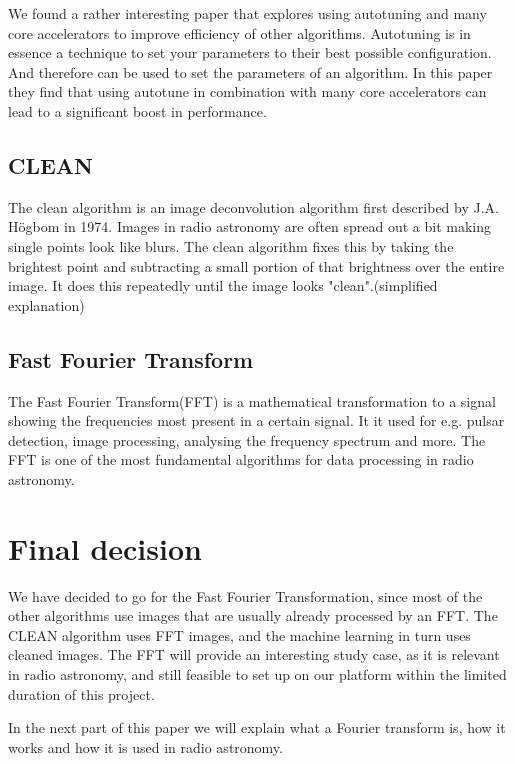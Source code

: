 \documentclass[11pt, A4, oneside]{article}
\begin{document}
We found a rather interesting paper that explores using autotuning and many core accelerators to improve efficiency of other algorithms\cite{Autotune}. Autotuning is in essence a technique to set your parameters to their best possible configuration. And therefore can be used to set the parameters of an algorithm. In this paper they find that using autotune in combination with many core accelerators can lead to a significant boost in performance.

\newpage

\subsection{CLEAN}

The clean algorithm is an image deconvolution algorithm first described by J.A. Högbom in 1974.\cite{CLEAN} Images in radio astronomy are often spread out a bit making single points look like blurs. The clean algorithm fixes this by taking the brightest point and subtracting a small portion of that brightness over the entire image. It does this repeatedly until the image looks "clean".(simplified explanation)

\subsection{Fast Fourier Transform}

The Fast Fourier Transform(FFT) is a mathematical transformation to a signal showing the frequencies most present in a certain signal. It it used for e.g. pulsar detection, image processing, analysing the frequency spectrum and more. The FFT is one of the most fundamental algorithms for data processing in radio astronomy. 

\section{Final decision}

We have decided to go for the Fast Fourier Transformation, since most of the other algorithms use images that are usually already processed by an FFT. The CLEAN algorithm uses FFT images, and the machine learning in turn uses cleaned images. The FFT will provide an interesting study case, as it is relevant in radio astronomy, and still feasible to set up on our platform within the limited duration of this project.    \\
\par
In the next part of this paper we will explain what a Fourier transform is, how it works and how it is used in radio astronomy. 
\newpage
\end{document}
